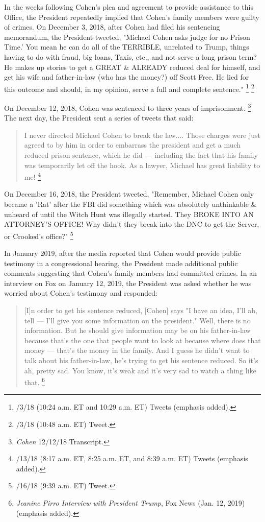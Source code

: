 In the weeks following Cohen's plea and agreement to provide assistance to this Office, the President repeatedly implied that Cohen's family members were guilty of crimes.
On December 3, 2018, after Cohen had filed his sentencing memorandum, the President tweeted, "Michael Cohen asks judge for no Prison Time.'
You mean he can do all of the TERRIBLE, unrelated to Trump, things having to do with fraud, big loans, Taxis, etc., and not serve a long prison term?
He makes up stories to get a GREAT \& ALREADY reduced deal for himself, and get his wife and father-in-law (who has the money?) off Scott Free.
He lied for this outcome and should, in my opinion, serve a full and complete sentence."%
\footnote{/3/18 (10:24 a.m. ET and 10:29 a.m. ET) Tweets (emphasis added).}
\footnote{/3/18 (10:48 a.m. ET) Tweet.}

On December 12, 2018, Cohen was sentenced to three years of imprisonment.%
\footnote{\textit{Cohen} 12/12/18 Transcript.}
The next day, the President sent a series of tweets that said:

\begin{quote}
I never directed Michael Cohen to break the law....
Those charges were just agreed to by him in order to embarrass the president and get a much reduced prison sentence, which he did — including the fact that his family was temporarily let off the hook.
As a lawyer, Michael has great liability to me!%
\footnote{/13/18 (8:17 a.m. ET, 8:25 a.m. ET, and 8:39 a.m. ET) Tweets (emphasis added).}
\end{quote}

On December 16, 2018, the President tweeted, "Remember, Michael Cohen only became a 'Rat' after the FBI did something which was absolutely unthinkable \& unheard of until the Witch Hunt was illegally started.
They BROKE INTO AN ATTORNEY'S OFFICE!
Why didn't they break into the DNC to get the Server, or Crooked's office?"%
\footnote{/16/18 (9:39 a.m. ET) Tweet.}

In January 2019, after the media reported that Cohen would provide public testimony in a congressional hearing, the President made additional public comments suggesting that Cohen's family members had committed crimes.
In an interview on Fox on January 12, 2019, the President was asked whether he was worried about Cohen's testimony and responded:

\begin{quote}
[I]n order to get his sentence reduced, [Cohen] says "I have an idea, I'll ah, tell — I'll give you some information on the president."
Well, there is no information.
But he should give information may be on his father-in-law because that's the one that people want to look at because where does that money — that's the money in the family.
And I guess he didn't want to talk about his father-in-law, he's trying to get his sentence reduced.
So it's ah, pretty sad.
You know, it's weak and it's very sad to watch a thing like that.%
\footnote{\textit{Jeanine Pirro Interview with President Trump}, Fox News (Jan. 12, 2019) (emphasis added).}
\end{quote}

